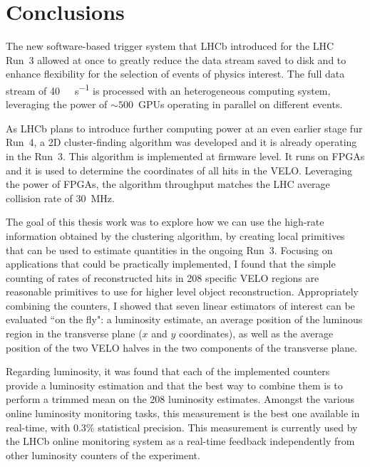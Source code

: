 
\chapter{Conclusions}
\label{chp:conclusion}
The new software-based trigger system that LHCb introduced for the LHC Run~3 allowed at once to greatly reduce the data stream saved to disk and to enhance flexibility for the selection of events of physics interest. The full data stream of \SI{40}{\tera\bit\per\second} is processed with an heterogeneous computing system, leveraging the power of $\sim 500$~GPUs operating in parallel on different events.

As LHCb plans to introduce further computing power at an even earlier stage fur Run~4, a 2D cluster-finding algorithm was developed and it is already operating in the Run~3. This algorithm is implemented at firmware level. It runs on FPGAs and it is used to determine the coordinates of all hits in the VELO. Leveraging the power of FPGAs, the algorithm throughput matches the LHC average collision rate of \SI{30}{\mega\hertz}.

The goal of this thesis work was to explore how we can use the high-rate information obtained by the clustering algorithm, by creating local primitives that can be used to estimate quantities in the ongoing Run~3.
Focusing on applications that could be practically implemented, I found that the simple counting of rates of reconstructed hits in 208 specific VELO regions are reasonable primitives to use for higher level object reconstruction. Appropriately combining the counters, I showed that seven linear estimators of interest can be evaluated ``on the fly": a luminosity estimate, an average position of the luminous region in the transverse plane ($x$ and $y$ coordinates), as well as the average position of the two VELO halves in the two components of the transverse plane.

Regarding luminosity, it was found that each of the implemented counters provide a luminosity estimation and that the best way to combine them is to perform a trimmed mean on the 208 luminosity estimates. Amongst the various online luminosity monitoring tasks, this measurement is the best one available in real-time, with 0.3\% statistical precision. This measurement is currently used by the LHCb online monitoring system as a real-time feedback independently from other luminosity counters of the experiment.


